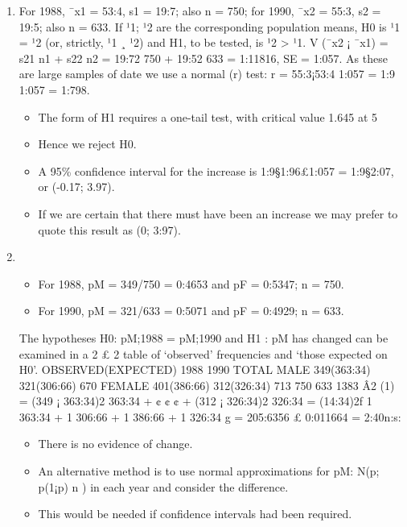 \documentclass[a4paper,12pt]{article}
\begin{document}
\begin{enumerate}

\item  For 1988, ¯x1 = 53:4, s1 = 19:7; also n = 750;
for 1990, ¯x2 = 55:3, s2 = 19:5; also n = 633.
If ¹1; ¹2 are the corresponding population means, H0 is ¹1 = ¹2 (or, strictly,
¹1 ¸ ¹2) and H1, to be tested, is ¹2 > ¹1.
V (¯x2 ¡ ¯x1) = s21
n1
+ s22
n2
= 19:72
750 + 19:52
633 = 1:11816, SE = 1:057.
As these are large samples of date we use a normal (r) test:
r = 55:3¡53:4
1:057 = 1:9
1:057 = 1:798.
\begin{itemize}
\item The form of H1 requires a one-tail test, with critical value 1.645 at 5%
\item Hence we reject H0.
\item A 95\% confidence interval for the increase is 1:9§1:96£1:057 = 1:9§2:07,
or (-0.17; 3.97).
\item If we are certain that there must have been an increase we may prefer to
quote this result as (0; 3:97).
\end{itemize}

\item 

\begin{itemize}
\item For 1988, pM = 349/750 = 0:4653 and pF = 0:5347; n = 750.
\item For 1990, pM = 321/633 = 0:5071 and pF = 0:4929; n = 633.
\end{itemize}
The hypotheses H0: pM;1988 = pM;1990 and H1 : pM has changed can be
examined in a 2 £ 2 table of ‘observed’ frequencies and ‘those expected on
H0’.
OBSERVED(EXPECTED) 1988 1990 TOTAL
MALE 349(363:34) 321(306:66) 670
FEMALE 401(386:66) 312(326:34) 713
750 633 1383
Â2
(1) =
(349 ¡ 363:34)2
363:34
+ ¢ ¢ ¢ +
(312 ¡ 326:34)2
326:34
= (14:34)2f
1
363:34
+
1
306:66
+
1
386:66
+
1
326:34
g
= 205:6356 £ 0:011664 = 2:40n:s:
\begin{itemize}
    \item There is no evidence of change.
\item An alternative method is to use normal approximations for pM: N(p; p(1¡p)
n )
in each year and consider the difference. 
\item This would be needed if confidence
intervals had been required. 
\end{itemize}

\end{enumerate}
\end{document}
